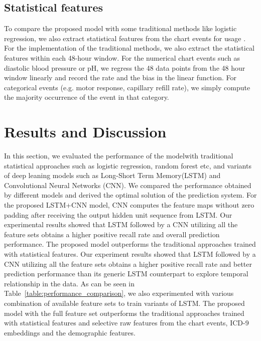 \documentclass[letterpaper, 10pt, conference]{ieeeconf} %
\newcommand{\fig}[1]{Fig.~\ref{#1}}
\newcommand{\tab}[1]{Table~\ref{#1}}
\begin{document}
\subsection{Statistical features}
To compare the proposed model with some traditional methods like logistic regression, we also extract statistical features from the chart events for usage \cite{lin2018analysis}.
For the implementation of the traditional methods, we also extract the statistical features within each 48-hour window. For the numerical chart events such as diastolic blood pressure or pH, we regress the 48 data points from the 48 hour window linearly and record the rate and the bias in the linear function. For categorical events 
(e.g. motor response, capillary refill rate), we simply compute the majority occurrence of the event in that category.

\section{Results and Discussion} \label{sec:results}

 In this section, we evaluated the performance of the modelwith traditional statistical approaches such as logistic regression, random forest etc, and variants of deep leaning models such as Long-Short Term Memory(LSTM) and Convolutional Neural Networks (CNN). We compared the performance obtained by different models and derived the optimal solution of the prediction system. 
 For the proposed LSTM+CNN model, CNN computes the feature maps without zero padding after receiving the output hidden unit sequence from LSTM. Our experimental results showed that LSTM followed by a CNN utilizing all the feature sets obtains a higher positive recall rate and overall prediction performance. The proposed model outperforms the traditional approaches trained with statistical features. 
 Our experiment results showed that LSTM followed by a CNN utilizing all the feature sets obtains a
higher positive recall rate and better prediction performance than its generic LSTM counterpart to explore temporal relationship in the data. As can be seen in \tab{table:performance_comparison}, we also experimented with various combination of available feature sets to train variants of LSTM. The proposed model with the full feature set outperforms the traditional approaches trained with statistical features and selective raw features from the chart events, ICD-9 embeddings and the demographic features. 
\end{document}
